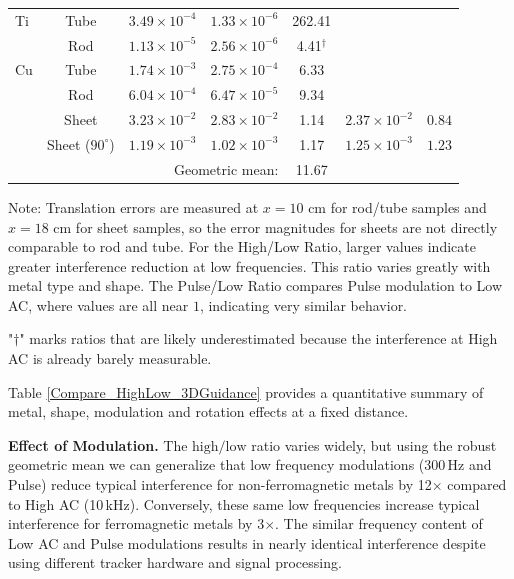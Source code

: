 \documentclass[journal,twoside,web]{ieeecolor}
\begin{document}
\begin{table}[!htbp]
\begin{tabular}{|l|c|c|c|c|c|c|}
Ti 
&Tube& $3.49\times 10^{-4}$& $1.33\times 10^{-6}$& 262.41 &$ $&$ $\\
$ $ &Rod& $1.13\times 10^{-5}$& $2.56\times 10^{-6}$ & 4.41$^{\dagger}$ &$ $&$ $\\
\hline

Cu 
&Tube& $1.74\times 10^{-3}$& $2.75\times 10^{-4}$& 6.33 &$ $&$ $\\
$ $ &Rod& $6.04\times 10^{-4}$& $6.47\times 10^{-5}$ & 9.34 &$ $&$ $\\
$ $ &Sheet& $3.23\times 10^{-2}$& $2.83\times 10^{-2}$ & 1.14 &$2.37\times 10^{-2}$&$0.84$ \\
$ $ &Sheet ($90^\circ$)& $1.19\times 10^{-3}$& $1.02\times 10^{-3}$ & 1.17 &$1.25\times 10^{-3}$&$1.23$ \\
\hline

\multicolumn{4}{|r|}{Geometric mean:}& 11.67 & \multicolumn{2}{|c|}{\centering {$ $}}\\
\hline
\end{tabular}

\vspace{0.5em}
\footnotesize{Note: Translation errors are measured at $x = 10$ cm for rod/tube samples and $x = 18$ cm for sheet samples, so the error magnitudes for sheets are not directly comparable to rod and tube. For the High/Low Ratio, larger values indicate greater interference reduction at low frequencies. This ratio varies greatly with metal type and shape. The Pulse/Low Ratio compares Pulse modulation to Low AC, where values are all near $1$, indicating very similar behavior.

"$\dagger$" marks ratios that are likely underestimated because the interference at High AC is already barely measurable.}
\end{table}

Table \ref{Compare_HighLow_3DGuidance} provides a quantitative summary of metal, shape, modulation and rotation effects at a fixed distance.

\textbf{Effect of Modulation.} The $\mathrm{high}/\mathrm{low}$ ratio varies widely, but using the robust geometric mean we can generalize that low frequency modulations (300\,Hz and Pulse) reduce typical interference for non-ferromagnetic metals by 12$\times$ compared to High AC (10\,kHz). Conversely, these same low frequencies increase typical interference for ferromagnetic metals by 3$\times$. The similar frequency content of Low AC and Pulse modulations results in nearly identical interference despite using different tracker hardware and signal processing. 
\end{document}
